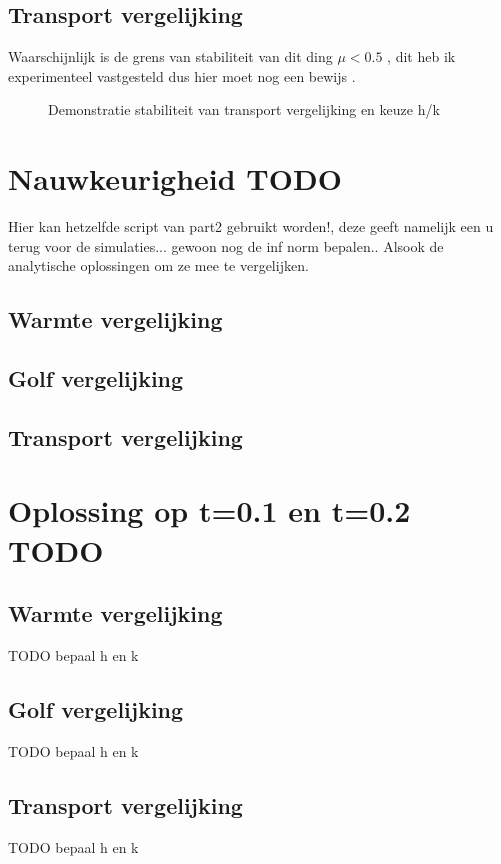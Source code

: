 \documentclass[11pt]{article} %
\begin{document}
	\subsection{Transport vergelijking}
	Waarschijnlijk is de grens van stabiliteit van dit ding $\mu<0.5$ , dit heb ik experimenteel vastgesteld dus hier moet nog een bewijs .
	\begin{figure}[H]
		\centering
		\hfill
		\caption{Demonstratie stabiliteit van transport vergelijking en keuze h/k}
	\end{figure}
\clearpage
\section{Nauwkeurigheid TODO}
Hier kan hetzelfde script van part2 gebruikt worden!, deze geeft namelijk een u terug voor de simulaties... gewoon nog de inf norm bepalen.. Alsook de analytische oplossingen om ze mee te vergelijken.
	\subsection{Warmte vergelijking}
	\subsection{Golf vergelijking}
	\subsection{Transport vergelijking}
\clearpage
\section{Oplossing op t=0.1 en t=0.2 TODO}
	\subsection{Warmte vergelijking}
	TODO bepaal h en k
	\subsection{Golf vergelijking}
	TODO bepaal h en k
	\subsection{Transport vergelijking}
	TODO bepaal h en k
\end{document}
